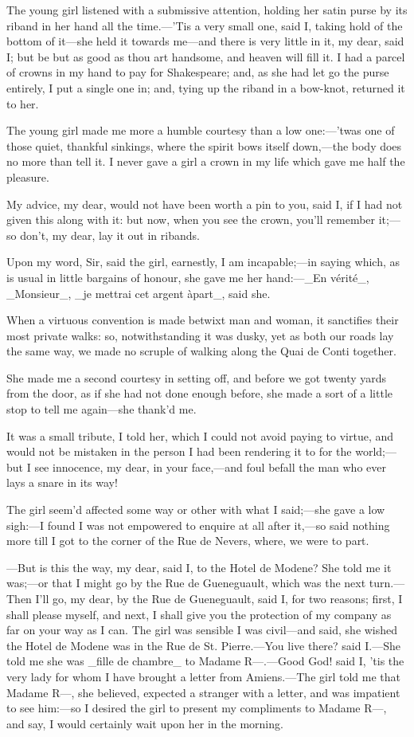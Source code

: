 \documentclass[twoside]{article}
\begin{document}
The young girl listened with a submissive attention, holding her satin
purse by its riband in her hand all the time.—’Tis a very small one, said
I, taking hold of the bottom of it—she held it towards me—and there is
very little in it, my dear, said I; but be but as good as thou art
handsome, and heaven will fill it.  I had a parcel of crowns in my hand
to pay for Shakespeare; and, as she had let go the purse entirely, I put
a single one in; and, tying up the riband in a bow-knot, returned it to
her.

The young girl made me more a humble courtesy than a low one:—’twas one
of those quiet, thankful sinkings, where the spirit bows itself down,—the
body does no more than tell it.  I never gave a girl a crown in my life
which gave me half the pleasure.

My advice, my dear, would not have been worth a pin to you, said I, if I
had not given this along with it: but now, when you see the crown, you’ll
remember it;—so don’t, my dear, lay it out in ribands.

Upon my word, Sir, said the girl, earnestly, I am incapable;—in saying
which, as is usual in little bargains of honour, she gave me her
hand:—_En vérité_, _Monsieur_, _je mettrai cet argent àpart_, said she.

When a virtuous convention is made betwixt man and woman, it sanctifies
their most private walks: so, notwithstanding it was dusky, yet as both
our roads lay the same way, we made no scruple of walking along the Quai
de Conti together.

She made me a second courtesy in setting off, and before we got twenty
yards from the door, as if she had not done enough before, she made a
sort of a little stop to tell me again—she thank’d me.

It was a small tribute, I told her, which I could not avoid paying to
virtue, and would not be mistaken in the person I had been rendering it
to for the world;—but I see innocence, my dear, in your face,—and foul
befall the man who ever lays a snare in its way!

The girl seem’d affected some way or other with what I said;—she gave a
low sigh:—I found I was not empowered to enquire at all after it,—so said
nothing more till I got to the corner of the Rue de Nevers, where, we
were to part.

—But is this the way, my dear, said I, to the Hotel de Modene?  She told
me it was;—or that I might go by the Rue de Gueneguault, which was the
next turn.—Then I’ll go, my dear, by the Rue de Gueneguault, said I, for
two reasons; first, I shall please myself, and next, I shall give you the
protection of my company as far on your way as I can.  The girl was
sensible I was civil—and said, she wished the Hotel de Modene was in the
Rue de St. Pierre.—You live there? said I.—She told me she was _fille de
chambre_ to Madame R—.—Good God! said I, ’tis the very lady for whom I
have brought a letter from Amiens.—The girl told me that Madame R—, she
believed, expected a stranger with a letter, and was impatient to see
him:—so I desired the girl to present my compliments to Madame R—, and
say, I would certainly wait upon her in the morning.
\end{document}
